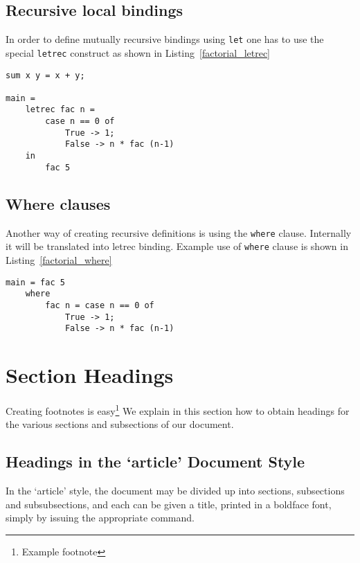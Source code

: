\documentclass[a4paper]{report}
\begin{document}
\subsection{Recursive local bindings}
In order to define mutually recursive bindings using \texttt{let} one has to use the
special \texttt{letrec} construct as shown in Listing~\ref{factorial_letrec}


\begin{lstlisting}[label=factorial_letrec,caption={Factorial function using \texttt{letrec}.}]
sum x y = x + y;

main =
    letrec fac n =
        case n == 0 of
            True -> 1;
            False -> n * fac (n-1)
    in
        fac 5
\end{lstlisting}

\subsection{Where clauses}
Another way of creating recursive definitions is using the \texttt{where}
clause. Internally it will be translated into letrec binding. Example use of
\texttt{where} clause is shown in Listing~\ref{factorial_where}


\begin{lstlisting}[label=factorial_where,caption={Factorial function using \texttt{where}.}]
main = fac 5
    where
        fac n = case n == 0 of
            True -> 1;
            False -> n * fac (n-1)
\end{lstlisting}

\section{Section Headings}

Creating footnotes is easy\footnote{Example footnote}
We explain in this section how to obtain headings
for the various sections and subsections of our
document.

\subsection{Headings in the `article' Document Style}

In the `article' style, the document may be divided up
into sections, subsections and subsubsections, and each
can be given a title, printed in a boldface font, simply by issuing the
appropriate command.
\end{document}
